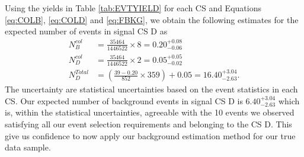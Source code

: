 \vspace{5mm}
Using the yields in Table \ref{tab:EVTYIELD} for each CS and Equations \ref{eq:COLB}, \ref{eq:COLD} and \ref{eq:FBKG}, we obtain the following estimates for the expected number of events in signal CS \textsf{D} as
\begin{align*} 
 N_{B}^{col} &= \frac{35464}{1446522} \times 8 = 0.20^{+0.08}_{-0.06} \\
 N_{D}^{col} &= \frac{35464}{1446522} \times 2 = 0.05^{+0.05}_{-0.02} \\
 N_{D}^{Total} &= \left( \frac{39 - 0.20}{852}\times 359\right) +  0.05 = 16.40^{+3.04}_{-2.63}.
\end{align*}
The uncertainty are statistical uncertainties based on the event statistics in each CS. Our expected number of background events in signal CS \textsf{D} is $6.40^{+3.04}_{-2.63}$  which is, within the statistical uncertainties, agreeable with the 10 events we observed satisfying all our event selection requirements and belonging to the CS \textsf{D}. 
This give us confidence to now apply our background estimation method for our true data sample.
